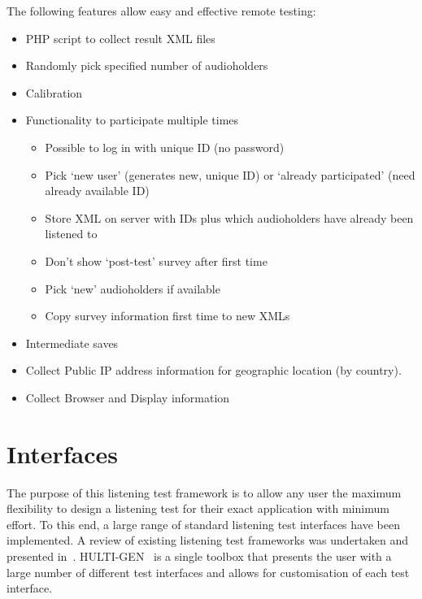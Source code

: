 \documentclass{sig-alternate}
\begin{document}
	The following features allow easy and effective remote testing: 
	\begin{itemize}[noitemsep,nolistsep]
		\item PHP script to collect result XML files
		\item Randomly pick specified number of audioholders
		\item Calibration
		\item Functionality to participate multiple times
			\begin{itemize}[noitemsep,nolistsep]
				\item Possible to log in with unique ID (no password)
				\item Pick `new user' (generates new, unique ID) or `already participated' (need already available ID)
				\item Store XML on server with IDs plus which audioholders have already been listened to
				\item Don't show `post-test' survey after first time
				\item Pick `new' audioholders if available
				\item Copy survey information first time to new XMLs
			\end{itemize}
		\item Intermediate saves
		\item Collect Public IP address information for geographic location (by country).
		\item Collect Browser and Display information 
	\end{itemize}

	
\section{Interfaces} %

The purpose of this listening test framework is to allow any user the maximum flexibility to design a listening test for their exact application with minimum effort. To this end, a large range of standard listening test interfaces have been implemented. A review of existing listening test frameworks was undertaken and presented in~. HULTI-GEN~\cite{hultigen} is a single toolbox that presents the user with a large number of different test interfaces and allows for customisation of each test interface.
\end{document}
